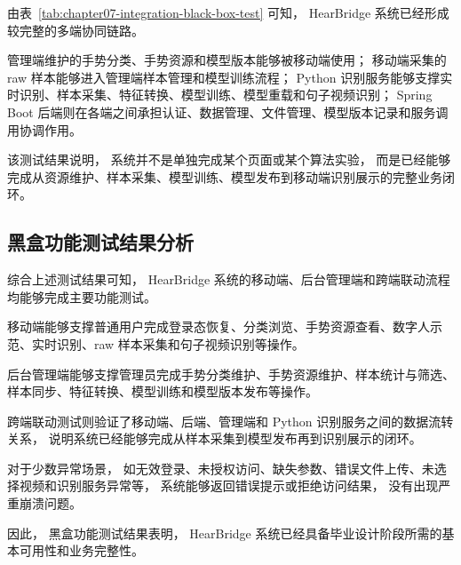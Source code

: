 由表~\ref{tab:chapter07-integration-black-box-test} 可知，
HearBridge 系统已经形成较完整的多端协同链路。

管理端维护的手势分类、手势资源和模型版本能够被移动端使用；
移动端采集的 raw 样本能够进入管理端样本管理和模型训练流程；
Python 识别服务能够支撑实时识别、样本采集、特征转换、模型训练、模型重载和句子视频识别；
Spring Boot 后端则在各端之间承担认证、数据管理、文件管理、模型版本记录和服务调用协调作用。

该测试结果说明，
系统并不是单独完成某个页面或某个算法实验，
而是已经能够完成从资源维护、样本采集、模型训练、模型发布到移动端识别展示的完整业务闭环。

\subsection{黑盒功能测试结果分析}

综合上述测试结果可知，
HearBridge 系统的移动端、后台管理端和跨端联动流程均能够完成主要功能测试。

移动端能够支撑普通用户完成登录态恢复、分类浏览、手势资源查看、数字人示范、实时识别、raw 样本采集和句子视频识别等操作。

后台管理端能够支撑管理员完成手势分类维护、手势资源维护、样本统计与筛选、样本同步、特征转换、模型训练和模型版本发布等操作。

跨端联动测试则验证了移动端、后端、管理端和 Python 识别服务之间的数据流转关系，
说明系统已经能够完成从样本采集到模型发布再到识别展示的闭环。

对于少数异常场景，
如无效登录、未授权访问、缺失参数、错误文件上传、未选择视频和识别服务异常等，
系统能够返回错误提示或拒绝访问结果，
没有出现严重崩溃问题。

因此，
黑盒功能测试结果表明，
HearBridge 系统已经具备毕业设计阶段所需的基本可用性和业务完整性。